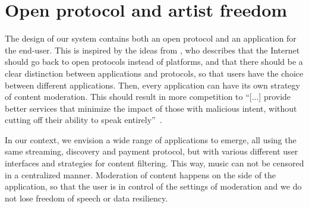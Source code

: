 


\section{Open protocol and artist freedom}
The design of our system contains both an open protocol and an application for the end-user. This is inspired by the ideas from \cite{masnick2019protocols}, who describes that the Internet should go back to open protocols instead of platforms, and that there should be a clear distinction between applications and protocols, so that users have the choice between different applications. Then, every application can have its own strategy of content moderation. This should result in more competition to ``[...] provide better services that minimize the impact of those with malicious intent, without cutting off their ability to speak entirely''~\citep{masnick2019protocols}.

In our context, we envision a wide range of applications to emerge, all using the same streaming, discovery and payment protocol, but with various different user interfaces and strategies for content filtering. This way, music can not be censored in a centralized manner. Moderation of content happens on the side of the application, so that the user is in control of the settings of moderation and we do not lose freedom of speech or data resiliency.

